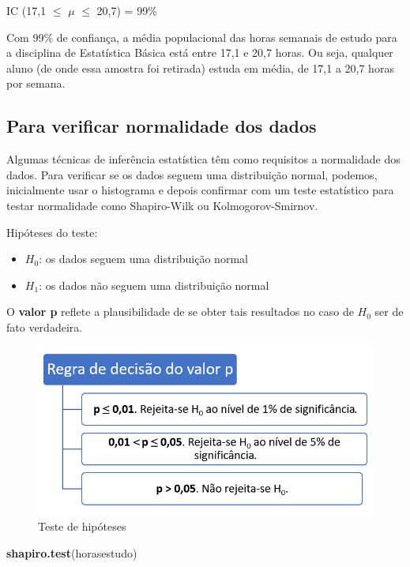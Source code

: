 \documentclass[12pt,brazil,oneside]{book}
\newenvironment{Shaded}{\begin{snugshade}}{\end{snugshade}}
\newcommand{\KeywordTok}[1]{\textcolor[rgb]{0.13,0.29,0.53}{\textbf{#1}}}
\newcommand{\NormalTok}[1]{#1}
\providecommand{\tightlist}{%
  \setlength{\itemsep}{0pt}\setlength{\parskip}{0pt}}
\begin{document}
IC (17,1 \(\leq\) \(\mu\) \(\leq\) 20,7) = 99\%

Com 99\% de confiança, a média populacional das horas semanais de estudo para a disciplina de Estatística Básica está entre 17,1 e 20,7 horas. Ou seja, qualquer aluno (de onde essa amostra foi retirada) estuda em média, de 17,1 a 20,7 horas por semana.

\hypertarget{para-verificar-normalidade-dos-dados}{%
\subsection{Para verificar normalidade dos dados}\label{para-verificar-normalidade-dos-dados}}

Algumas técnicas de inferência estatística têm como requisitos a normalidade dos dados. Para verificar se os dados seguem uma distribuição normal, podemos, inicialmente usar o histograma e depois confirmar com um teste estatístico para testar normalidade como Shapiro-Wilk ou Kolmogorov-Smirnov.

Hipóteses do teste:

\begin{itemize}
\tightlist
\item
  \textbf{\(H_0\)}: os dados seguem uma distribuição normal
\item
  \textbf{\(H_1\)}: os dados não seguem uma distribuição normal
\end{itemize}

O \textbf{valor p} reflete a plausibilidade de se obter tais resultados no caso de \(H_0\) ser de fato verdadeira.

\begin{figure}[H]

{\centering \includegraphics[width=0.8\linewidth]{testehip1} 

}

\caption{Teste de hipóteses}\label{fig:testehip1}
\end{figure}

\begin{Shaded}
\begin{Highlighting}[]
\KeywordTok{shapiro.test}\NormalTok{(horasestudo)}
\end{Highlighting}
\end{Shaded}
\end{document}

